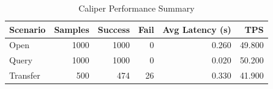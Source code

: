 \begin{table}
\caption{Caliper Performance Summary}
\label{tab:caliper_round}
\begin{tabular}{lrrrrr}
\toprule
Scenario & Samples & Success & Fail & Avg Latency (s) & TPS \\
\midrule
Open & 1000 & 1000 & 0 & 0.260 & 49.800 \\
Query & 1000 & 1000 & 0 & 0.020 & 50.200 \\
Transfer & 500 & 474 & 26 & 0.330 & 41.900 \\
\bottomrule
\end{tabular}
\end{table}
